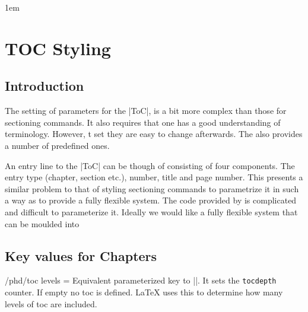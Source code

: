 \makeatletter\@specialfalse\makeatother
\parindent1em
\chapter{TOC Styling}
\label{ch:toc}




\section{Introduction}

The setting of parameters for the |ToC|, is a bit more complex than those for sectioning commands. It also requires that one has a good understanding of \latexe terminology. However, t set they are easy to change afterwards.
The  also provides a number of predefined ones.

An entry line to the |ToC| can be though of consisting of four components. The entry type (chapter, section etc.), number, title and page number. This presents a similar problem to that of styling sectioning commands to parametrize it in such a way as to provide a fully flexible system. The code provided by \latexe is complicated and difficult to parameterize it. Ideally we would like a fully flexible system that can be moulded into  






\section{Key values for Chapters}


\begin{key}{/phd/toc levels = }
 Equivalent parameterized key to |\toclevel|. It sets  the \texttt{tocdepth} counter. If empty no toc is defined. LaTeX uses this to determine how many levels of toc are included.
\end{key}

